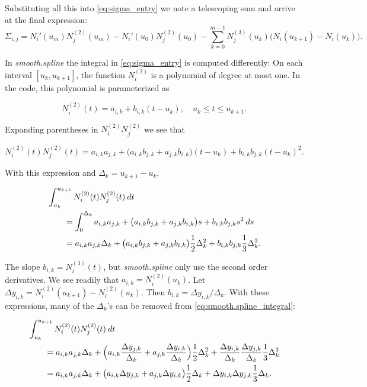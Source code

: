 \documentclass[a4paper]{scrartcl}
\newcommand\dd{\ensuremath{\:d}}
\begin{document}
Substituting all this into \cref{eq:sigma_entry} we note a telescoping sum and arrive at the final expression:
\begin{equation}
    \label{eq:sigma_entry_computation}
    \Sigma_{i,j}
    = N_i'(u_m) N_j^{(2)}(u_m) - N_i'(u_0) N_j^{(2)}(u_0) 
    - \sum_{k = 0}^{m - 1} N_j^{(3)}(u_k) \bigl(N_i(u_{k+1}) - N_i(u_k)\bigr).
\end{equation}

In \textit{smooth.spline} the integral in \cref{eq:sigma_entry} is computed differently:
On each interval $[u_k, u_{k+1}]$, the function $N_i^{(2)}$ is a polynomial of degree at most one.
In the code, this polynomial is parameterized as

\begin{equation*}
    N_i^{(2)}(t) 
    = a_{i,k} + b_{i,k} (t - u_k), 
    \quad u_k\leq t\leq u_{k+1}.
\end{equation*}

Expanding parentheses in $N_i^{(2)} N_j^{(2)}$ we see that

\begin{equation*}
    N_i^{(2)}(t) N_j^{(2)}(t)
    = a_{i,k} a_{j,k} + \bigl(a_{i,k} b_{j,k} + a_{j,k} b_{i,k}\bigr) (t - u_k) + b_{i,k} b_{j,k} (t - u_k)^2.
\end{equation*}

With this expression and $\Delta_k = u_{k+1} - u_k$,

\begin{align}
    \MoveEqLeft
    \int_{u_k}^{u_{k+1}} N_i^{(2)}(t) N_j^{(2)}(t) \dd t 
    \nonumber
    \\
    & = \int_0^{\Delta_k} a_{i,k} a_{j,k} + \bigl(a_{i,k} b_{j,k} + a_{j,k} b_{i,k}\bigr) s + b_{i,k} b_{j,k} s^2 \dd s 
    \nonumber
    \\
    & = a_{i,k} a_{j,k} \Delta_k + \bigl(a_{i,k} b_{j,k} + a_{j,k} b_{i,k}\bigr) \frac12 \Delta_k^2 + b_{i,k} b_{j,k} \frac13 \Delta_k^3.
    \label{eq:smooth.spline_integral}
\end{align}

The slope $b_{i,k} = N_i^{(3)}(t)$, but \textit{smooth.spline} only use the second order derivatives.
We see readily that $a_{i,k} = N_i^{(2)}(u_k)$.
Let $\Delta y_{i,k} = N_i^{(2)}(u_{k+1}) - N_i^{(2)}(u_k)$.
Then $b_{i,k} = \Delta y_{i,k} / \Delta_k$.
With these expressions, many of the $\Delta_k$'s can be removed from \cref{eq:smooth.spline_integral}:

\begin{align*}
    \MoveEqLeft
    \int_{u_k}^{u_{k+1}} N_i^{(2)}(t) N_j^{(2)}(t) \dd t 
    \\
    & = a_{i,k} a_{j,k} \Delta_k + \Bigl(a_{i,k} \frac{\Delta y_{j,k}}{\Delta_k} + a_{j,k} \frac{\Delta y_{i,k}}{\Delta_k}\Bigr) \frac12 \Delta_k^2 + \frac{\Delta y_{i,k}}{\Delta_k} \frac{\Delta y_{j,k}}{\Delta_k} \frac13 \Delta_k^3
    \\
    & = a_{i,k} a_{j,k} \Delta_k + \bigl(a_{i,k} \Delta y_{j,k} + a_{j,k} \Delta y_{i,k}\bigr) \frac12 \Delta_k + \Delta y_{i,k} \Delta y_{j,k} \frac13 \Delta_k.
\end{align*}
\end{document}
